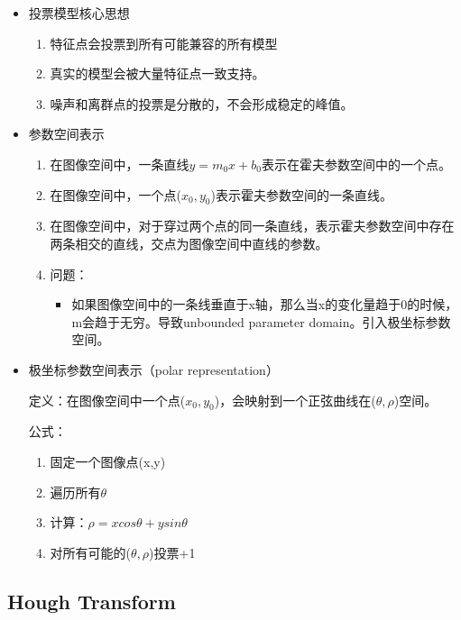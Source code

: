 \documentclass[UTF8]{ctexart}
\begin{document}
\begin{itemize}
    \item 投票模型核心思想
    \begin{enumerate}
        \item 特征点会投票到所有可能兼容的所有模型
        \item 真实的模型会被大量特征点一致支持。
        \item 噪声和离群点的投票是分散的，不会形成稳定的峰值。
    \end{enumerate}

    \item 参数空间表示
    
    \begin{enumerate}
        \item 在图像空间中，一条直线$y=m_0x+b_0$表示在霍夫参数空间中的一个点。
        \item 在图像空间中，一个点($x_0,y_0$)表示霍夫参数空间的一条直线。
        \item 在图像空间中，对于穿过两个点的同一条直线，表示霍夫参数空间中存在两条相交的直线，交点为图像空间中直线的参数。
        \item 问题：
        \begin{itemize}
            \item 如果图像空间中的一条线垂直于x轴，那么当x的变化量趋于0的时候，m会趋于无穷。导致unbounded parameter domain。引入极坐标参数空间。
        \end{itemize}
    \end{enumerate}

    \item 极坐标参数空间表示（polar representation）
    
    定义：在图像空间中一个点($x_0,y_0$)，会映射到一个正弦曲线在($\theta,\rho$)空间。

    公式：
    \begin{enumerate}
        \item 固定一个图像点(x,y)
        \item 遍历所有$\theta$
        \item 计算：$\rho=xcos\theta+ysin\theta$
        \item 对所有可能的($\theta,\rho$)投票+1
    \end{enumerate}
    
\end{itemize}

\subsection{Hough Transform}
\end{document}
